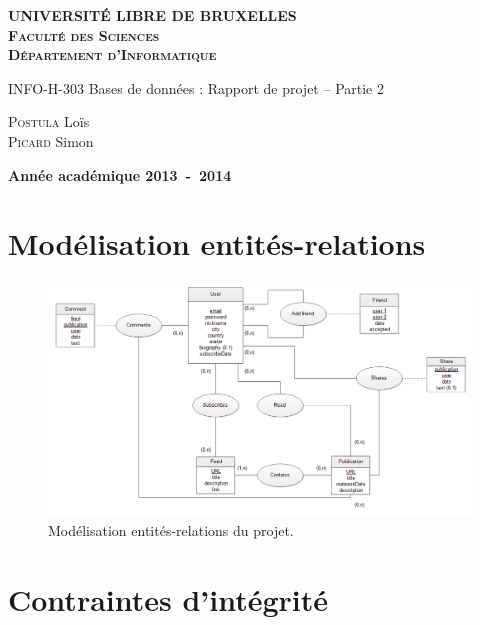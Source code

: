 \documentclass[a4paper,10pt]{article}
\begin{document}
\begin{titlepage}
  \begin{center}
    \textbf{\textsc{UNIVERSIT\'E LIBRE DE BRUXELLES}}\\
    \textbf{\textsc{Faculté des Sciences}}\\
    \textbf{\textsc{Département d'Informatique}}
    \vfill{}\vfill{}
    \begin{center}
	{\Huge INFO-H-303 Bases de données : Rapport de projet -- Partie 2}
    \end{center}
    {\Huge \par}
    \begin{center}
	{\large \textsc{Postula} Loïs \\ \textsc{Picard} Simon}
    \end{center}
    {\Huge \par}
    \vfill{}\vfill{}
    \textbf{Année académique 2013~-~2014}
  \end{center}
\end{titlepage}

\tableofcontents
\clearpage

    \section{Modélisation entités-relations}
	
	\begin{figure}[ht]
	\includegraphics[width = \textwidth]{dea.png}
	\caption{Modélisation entités-relations du projet.}
	\end{figure}

    \section{Contraintes d'intégrité}
    
\end{document}

